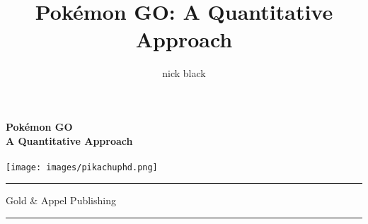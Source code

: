 \documentclass[ebook,10pt,openany,oneside]{memoir}
\title{Pokémon GO: A Quantitative Approach}
\author{nick black}
\def\LOGO {
  \textbf{
    \Huge Pokémon GO\\
    \Large A Quantitative Approach\\
  }}
\begin{document}
  \pagestyle{empty}
  \begin{center}
  \LOGO
  \bigskip
  \\
  \vspace{3cm}
  \texttt{[image: images/pikachuphd.png]}
  \end{center}
  \vfill\hrule
  \begin{center}\textsf{Gold \& Appel Publishing}\end{center}
  \hrule
  \clearpage
  \setcounter{page}{1}
  \pagestyle{plain} %

\clearpage
\ifdefined\epub
\else
  \hypertarget{toc}{}%
  \tableofcontents*
  \hypertarget{lot}{}%
  \listoftables*
  \fi

\mainmatter
\pagestyle{companion}
















\pagestyle{plain}
\appendix



\backmatter

\end{document}
